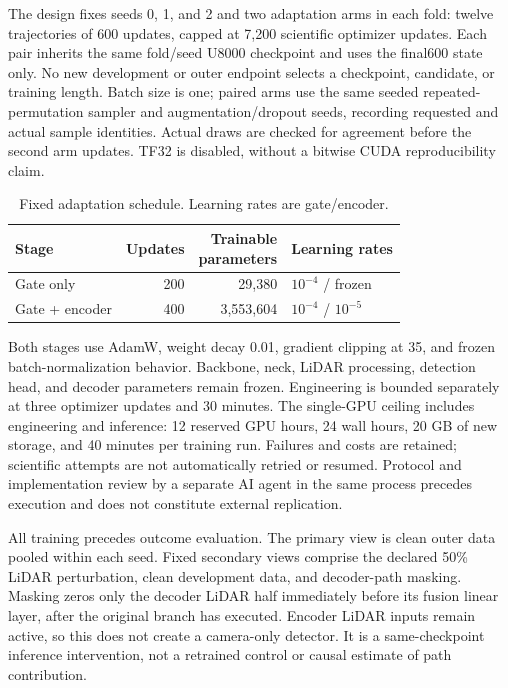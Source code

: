 The design fixes seeds 0, 1, and 2 and two adaptation arms in each fold: twelve trajectories of 600 updates, capped at 7,200 scientific optimizer updates. Each pair inherits the same fold/seed U8000 checkpoint and uses the final600 state only. No new development or outer endpoint selects a checkpoint, candidate, or training length. Batch size is one; paired arms use the same seeded repeated-permutation sampler and augmentation/dropout seeds, recording requested and actual sample identities. Actual draws are checked for agreement before the second arm updates. TF32 is disabled, without a bitwise CUDA reproducibility claim.

\begin{table}[t]
\centering
\small
\setlength{\tabcolsep}{3pt}
\caption{Fixed adaptation schedule. Learning rates are gate/encoder.}
\label{tab:adaptation}
\begin{tabular}{lrrl}
\toprule
Stage & Updates & \shortstack{Trainable\\parameters} & Learning rates\\
\midrule
Gate only & 200 & 29,380 & $10^{-4}$ / frozen\\
Gate + encoder & 400 & 3,553,604 & $10^{-4}$ / $10^{-5}$\\
\bottomrule
\end{tabular}
\end{table}

Both stages use AdamW, weight decay 0.01, gradient clipping at 35, and frozen batch-normalization behavior. Backbone, neck, LiDAR processing, detection head, and decoder parameters remain frozen. Engineering is bounded separately at three optimizer updates and 30 minutes. The single-GPU ceiling includes engineering and inference: 12 reserved GPU hours, 24 wall hours, 20 GB of new storage, and 40 minutes per training run. Failures and costs are retained; scientific attempts are not automatically retried or resumed. Protocol and implementation review by a separate AI agent in the same process precedes execution and does not constitute external replication.

All training precedes outcome evaluation. The primary view is clean outer data pooled within each seed. Fixed secondary views comprise the declared 50\% LiDAR perturbation, clean development data, and decoder-path masking. Masking zeros only the decoder LiDAR half immediately before its fusion linear layer, after the original branch has executed. Encoder LiDAR inputs remain active, so this does not create a camera-only detector. It is a same-checkpoint inference intervention, not a retrained control or causal estimate of path contribution.

